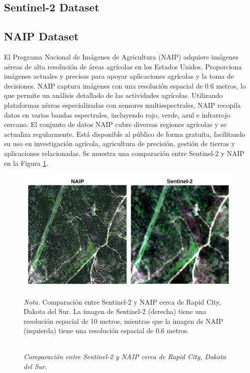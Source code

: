 \subsection{Sentinel-2 Dataset}

\subsection{NAIP Dataset}
El Programa Nacional de Imágenes de Agricultura (NAIP) adquiere imágenes aéreas de alta resolución de áreas agrícolas en los Estados Unidos. Proporciona imágenes actuales y precisas para apoyar aplicaciones agrícolas y la toma de decisiones. NAIP captura imágenes con una resolución espacial de 0.6 metros, lo que permite un análisis detallado de las actividades agrícolas. Utilizando plataformas aéreas especializadas con sensores multiespectrales, NAIP recopila datos en varias bandas espectrales, incluyendo rojo, verde, azul e infrarrojo cercano. El conjunto de datos NAIP cubre diversas regiones agrícolas y se actualiza regularmente. Está disponible al público de forma gratuita, facilitando su uso en investigación agrícola, agricultura de precisión, gestión de tierras y aplicaciones relacionadas. Se muestra una comparación entre Sentinel-2 y NAIP en la Figura \ref{fig:naip_comparison}.

\begin{figure}[H] 
    \caption{\doublespacing \\ \textit{Comparación entre Sentinel-2 y NAIP cerca de Rapid City, Dakota del Sur.}} 
    \centering
    \includegraphics[width=1\linewidth]{images/csaybar_fig02.png}
    \begin{justify}
        \textit{Nota.} Comparación entre Sentinel-2 y NAIP cerca de Rapid City, Dakota del Sur. La imagen de Sentinel-2 (derecha) tiene una resolución espacial de 10 metros, mientras que la imagen de NAIP (izquierda) tiene una resolución espacial de 0.6 metros.
    \end{justify}                    
    \label{fig:naip_comparison}
\end{figure}

